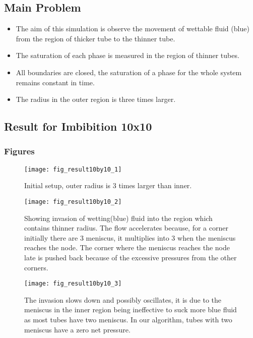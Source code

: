 \subsection{Main Problem}
\begin{itemize}
	\item The aim of this simulation is observe the movement of wettable fluid (blue) from the region of thicker tube to the thinner tube.
	\item The saturation of each phase is measured in the region of thinner tubes.
	\item All boundaries are closed, the saturation of a phase for the whole system remains constant in time.
	\item The radius in the outer region is three times larger.
\end{itemize}



\subsection{Result for Imbibition 10x10}
	\subsubsection{Figures}
		\begin{figure}[H]
			\texttt{[image: fig\_result10by10\_1]}
			\caption{Initial setup, outer radius is 3 times larger than inner.}
			\label{fig_invasion-result1}
		\end{figure}
		
		\begin{figure}[H]
			\texttt{[image: fig\_result10by10\_2]}
			\caption{Showing invasion of wetting(blue) fluid into the region which contains thinner radius. The flow accelerates because, for a corner initially there are 3 meniscus, it multiplies into 3 when the meniscus reaches the node. The corner where the meniscus reaches the node late is pushed back because of the excessive pressures from the other corners.}
			\label{fig_invasion-result2}
		\end{figure}
		
		
		\begin{figure}[H]
			\texttt{[image: fig\_result10by10\_3]}
			\caption{The invasion slows down and possibly oscillates, it is due to the meniscus in the inner region being ineffective to suck more blue fluid as most tubes have two meniscus. In our algorithm, tubes with two meniscus have a zero net pressure.}
			\label{fig_invasion-result3}
		\end{figure}
	
